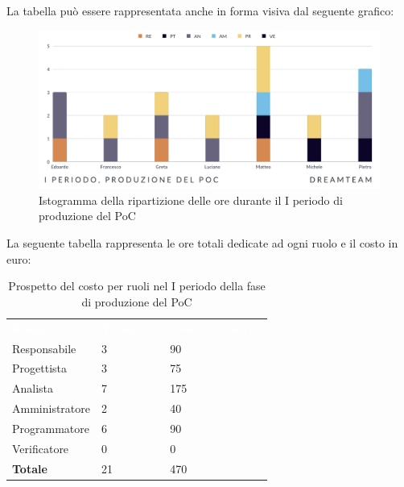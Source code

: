 La tabella può essere rappresentata anche in forma visiva dal seguente grafico:
\begin{figure}[H]
\centering
\includegraphics[scale=0.65]{Sezioni/SezioniPreventivo/grafici/Poc_I_periodo.png}
\caption{Istogramma della ripartizione delle ore durante il I periodo di produzione del PoC}
\end{figure}

La seguente tabella rappresenta le ore totali dedicate ad ogni ruolo e il costo in euro:

\begin{table}[H]
\begin{center}
\renewcommand{\arraystretch}{1.5}
\begin{tabular}{ m{}<{\centering}  m{}<{\centering} m{}<{\centering}}
	\rowcolor{darkblue}
	\textcolor{white}{\textbf{Ruolo}}&\textcolor{white}{\textbf{Totale ore}}&\textcolor{white}{\textbf{Costo totale (\euro)}}\\ 

	Responsabile  & 3 & 90 \\	
	
	Progettista & 3 & 75 \\
	
	Analista & 7 & 175 \\

	Amministratore & 2 & 40 \\
	
	Programmatore & 6 & 90 \\
	
	Verificatore & 0 & 0 \\
	
	\textbf{Totale} & 21 & 470 \\
	
\end{tabular}
\caption{Prospetto del costo per ruoli nel I periodo della fase di produzione del PoC}
\end{center}
\end{table}

